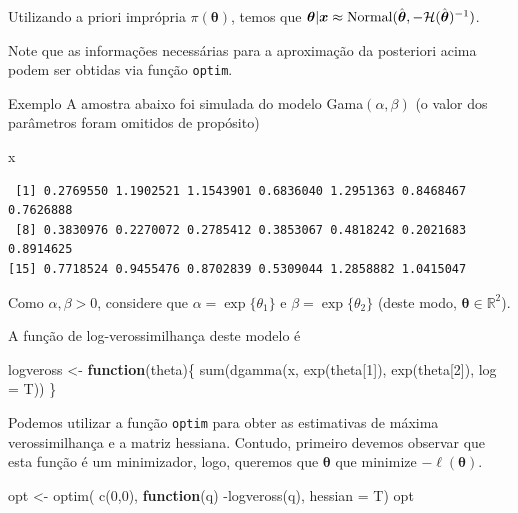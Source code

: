 \documentclass[
  letterpaper,
  DIV=11,
  numbers=noendperiod]{scrreprt}
\newenvironment{Shaded}{\begin{snugshade}}{\end{snugshade}}
\newcommand{\AttributeTok}[1]{\textcolor[rgb]{0.40,0.45,0.13}{#1}}
\newcommand{\ControlFlowTok}[1]{\textcolor[rgb]{0.00,0.23,0.31}{\textbf{#1}}}
\newcommand{\DecValTok}[1]{\textcolor[rgb]{0.68,0.00,0.00}{#1}}
\newcommand{\FunctionTok}[1]{\textcolor[rgb]{0.28,0.35,0.67}{#1}}
\newcommand{\NormalTok}[1]{\textcolor[rgb]{0.00,0.23,0.31}{#1}}
\newcommand{\OtherTok}[1]{\textcolor[rgb]{0.00,0.23,0.31}{#1}}
\newcommand{\SpecialCharTok}[1]{\textcolor[rgb]{0.37,0.37,0.37}{#1}}
\theoremstyle{definition}
\theoremstyle{definition}
\theoremstyle{plain}
\theoremstyle{remark}
\begin{document}
Utilizando a priori imprópria \(\pi(\boldsymbol{\theta})\), temos que
\(\boldsymbol{\theta}|\boldsymbol{x}\approx \hbox{Normal}(\hat{\boldsymbol{\theta}},-\mathcal{H}(\hat{\boldsymbol{\theta}})^{-1})\).

Note que as informações necessárias para a aproximação da posteriori
acima podem ser obtidas via função \texttt{optim}.

Exemplo A amostra abaixo foi simulada do modelo Gama\((\alpha,\beta)\)
(o valor dos parâmetros foram omitidos de propósito)

\begin{Shaded}
\begin{Highlighting}[]
\NormalTok{x}
\end{Highlighting}
\end{Shaded}

\begin{verbatim}
 [1] 0.2769550 1.1902521 1.1543901 0.6836040 1.2951363 0.8468467 0.7626888
 [8] 0.3830976 0.2270072 0.2785412 0.3853067 0.4818242 0.2021683 0.8914625
[15] 0.7718524 0.9455476 0.8702839 0.5309044 1.2858882 1.0415047
\end{verbatim}

Como \(\alpha,\beta>0\), considere que \(\alpha=\exp\{\theta_1\}\) e
\(\beta=\exp\{\theta_2\}\) (deste modo,
\(\boldsymbol{\theta}\in\mathbb{R}^2\)).

A função de log-verossimilhança deste modelo é

\begin{Shaded}
\begin{Highlighting}[]
\NormalTok{logveross }\OtherTok{\textless{}{-}} \ControlFlowTok{function}\NormalTok{(theta)\{ }\FunctionTok{sum}\NormalTok{(}\FunctionTok{dgamma}\NormalTok{(x, }\FunctionTok{exp}\NormalTok{(theta[}\DecValTok{1}\NormalTok{]), }\FunctionTok{exp}\NormalTok{(theta[}\DecValTok{2}\NormalTok{]), }\AttributeTok{log =}\NormalTok{ T))}
\NormalTok{\}}
\end{Highlighting}
\end{Shaded}

Podemos utilizar a função \texttt{optim} para obter as estimativas de
máxima verossimilhança e a matriz hessiana. Contudo, primeiro devemos
observar que esta função é um minimizador, logo, queremos que
\(\boldsymbol{\theta}\) que minimize \(-\ell({\boldsymbol{\theta}})\).

\begin{Shaded}
\begin{Highlighting}[]
\NormalTok{opt }\OtherTok{\textless{}{-}} \FunctionTok{optim}\NormalTok{( }\FunctionTok{c}\NormalTok{(}\DecValTok{0}\NormalTok{,}\DecValTok{0}\NormalTok{), }\ControlFlowTok{function}\NormalTok{(q) }\SpecialCharTok{{-}}\FunctionTok{logveross}\NormalTok{(q), }\AttributeTok{hessian =}\NormalTok{ T)}
\NormalTok{opt}
\end{Highlighting}
\end{Shaded}
\end{document}
